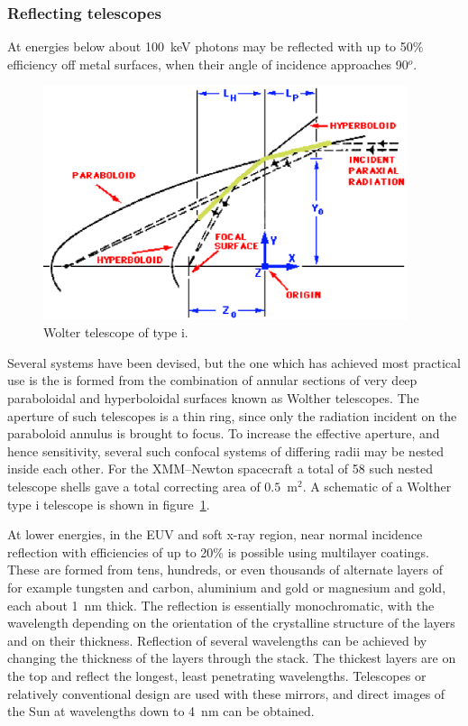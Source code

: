 \subsubsection{Reflecting telescopes}
At energies below about 100~keV photons
may be reflected with up to 50\% efficiency off metal surfaces, when
their angle of incidence approaches 90$^o$.

\begin{figure}[h]
  \centering
	\includegraphics[width=0.95\textwidth]{paraboloid_hyperboloid.eps}
  \caption{Wolter telescope of type {\sc i}.}
  \label{fig:wolther_i}
\end{figure}

Several systems have been devised, but the one which has achieved most practical
use is the is formed from the combination of annular sections of very deep paraboloidal
and hyperboloidal surfaces known as Wolther telescopes. The aperture of such
telescopes is a thin ring, since only the radiation incident on the paraboloid annulus is 
brought to focus. To increase the effective aperture, and hence sensitivity, several
such confocal systems of differing radii may be nested inside each other. For the 
XMM--Newton spacecraft a total of 58 such nested telescope shells gave a total
correcting area of $0.5$~m$^2$. A schematic of a Wolther type {\sc i} telescope is shown
in figure~\ref{fig:wolther_i}.

At lower energies, in the EUV and soft x-ray region, near normal incidence
reflection with efficiencies of up to 20\% is possible using multilayer coatings.
These are formed from tens,  hundreds, or even thousands of alternate layers of 
for example tungsten and carbon, aluminium and gold or magnesium and gold,
each about 1~nm thick. The reflection is essentially monochromatic, with the 
wavelength depending on the orientation of the crystalline structure of the layers and
on their thickness. Reflection of several wavelengths can be achieved by changing 
the thickness of the layers through the stack. The thickest layers are on the top and
reflect the longest, least penetrating wavelengths. Telescopes or relatively 
conventional design are used with these mirrors, and direct images of the Sun 
at wavelengths down to 4~nm can be obtained.

